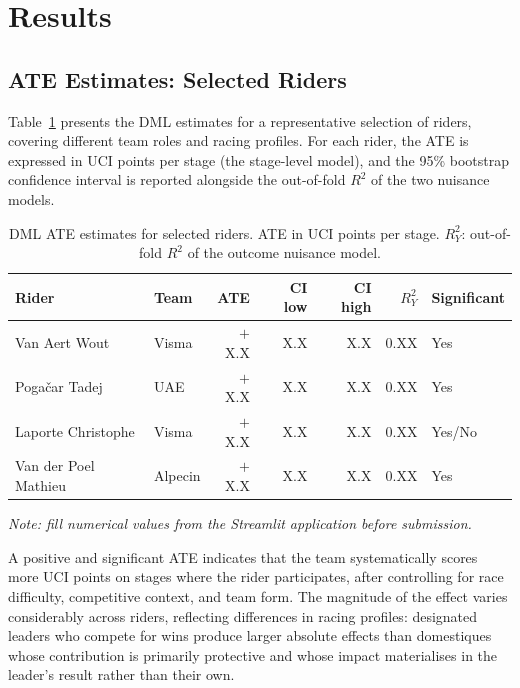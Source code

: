 \section{Results}

\subsection{ATE Estimates: Selected Riders}

Table~\ref{tab:ate_results} presents the DML estimates for a representative selection of riders, covering different team roles and racing profiles. For each rider, the ATE is expressed in UCI points per stage (the stage-level model), and the 95\% bootstrap confidence interval is reported alongside the out-of-fold $R^2$ of the two nuisance models.

\begin{table}[H]
\centering
\small
\begin{tabular}{llrrrrl}
\toprule
\textbf{Rider} & \textbf{Team} & \textbf{ATE} & \textbf{CI low} & \textbf{CI high} & \textbf{$R^2_Y$} & \textbf{Significant} \\
\midrule
Van Aert Wout         & Visma           & $+$X.X & X.X & X.X & 0.XX & Yes \\
Pogačar Tadej         & UAE             & $+$X.X & X.X & X.X & 0.XX & Yes \\
Laporte Christophe    & Visma           & $+$X.X & X.X & X.X & 0.XX & Yes/No \\
Van der Poel Mathieu  & Alpecin         & $+$X.X & X.X & X.X & 0.XX & Yes \\
\bottomrule
\end{tabular}
\caption{DML ATE estimates for selected riders. ATE in UCI points per stage. $R^2_Y$: out-of-fold $R^2$ of the outcome nuisance model.}
\label{tab:ate_results}
\end{table}

\noindent\textit{Note: fill numerical values from the Streamlit application before submission.}

A positive and significant ATE indicates that the team systematically scores more UCI points on stages where the rider participates, after controlling for race difficulty, competitive context, and team form. The magnitude of the effect varies considerably across riders, reflecting differences in racing profiles: designated leaders who compete for wins produce larger absolute effects than domestiques whose contribution is primarily protective and whose impact materialises in the leader's result rather than their own.

